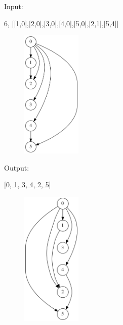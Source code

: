\documentclass[10pt]{article}
\begin{document}
\squishlist
  \item \parbox{40pt}{Input:}  \url{6, [[1,0],[2,0],[3,0],[4,0],[5,0],[2,1],[5,4]]}
\squishend
\begin{figure}[h!]
  \hspace{50pt}
  \hspace{50pt}
  \hspace{50pt}
  \includegraphics[width=80pt]{Input/Graph_6b.gv.png}
\end{figure}

\squishlist
  \item \parbox{40pt}{Output:} \url{[0, 1, 3, 4, 2, 5]}
\squishend
\begin{figure}[h!]
  \hspace{50pt}
  \includegraphics[width=80pt]{Output/Graph_6_soln.gv.png}
\end{figure}


\newpage
\end{document}
